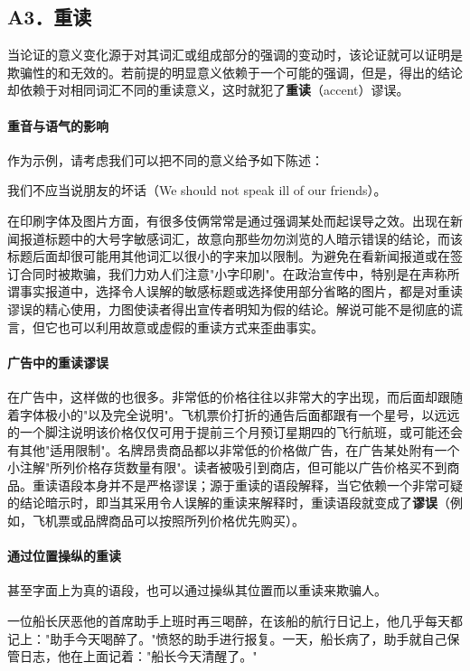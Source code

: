 \subsection{A3．重读}

当论证的意义变化源于对其词汇或组成部分的强调的变动时，该论证就可以证明是欺骗性的和无效的。若前提的明显意义依赖于一个可能的强调，但是，得出的结论却依赖于对相同词汇不同的重读意义，这时就犯了\textbf{重读}（accent）谬误。

\paragraph{重音与语气的影响}
作为示例，请考虑我们可以把不同的意义给予如下陈述：

我们不应当说朋友的坏话（We should not speak ill of our friends）。

在印刷字体及图片方面，有很多伎俩常常是通过强调某处而起误导之效。出现在新闻报道标题中的大号字敏感词汇，故意向那些勿勿浏览的人暗示错误的结论，而该标题后面却很可能用其他词汇以很小的字来加以限制。为避免在看新闻报道或在签订合同时被欺骗，我们力劝人们注意"小字印刷"。在政治宣传中，特别是在声称所谓事实报道中，选择令人误解的敏感标题或选择使用部分省略的图片，都是对重读谬误的精心使用，力图使读者得出宣传者明知为假的结论。解说可能不是彻底的谎言，但它也可以利用故意或虚假的重读方式来歪曲事实。

\paragraph{广告中的重读谬误}
在广告中，这样做的也很多。非常低的价格往往以非常大的字出现，而后面却跟随着字体极小的"以及完全说明"。飞机票价打折的通告后面都跟有一个星号，以远远的一个脚注说明该价格仅仅可用于提前三个月预订星期四的飞行航班，或可能还会有其他"适用限制"。名牌昂贵商品都以非常低的价格做广告，在广告某处附有一个小注解"所列价格存货数量有限"。读者被吸引到商店，但可能以广告价格买不到商品。重读语段本身并不是严格谬误；源于重读的语段解释，当它依赖一个非常可疑的结论暗示时，即当其采用令人误解的重读来解释时，重读语段就变成了\textbf{谬误}（例如，飞机票或品牌商品可以按照所列价格优先购买）。

\paragraph{通过位置操纵的重读}
甚至字面上为真的语段，也可以通过操纵其位置而以重读来欺骗人。

一位船长厌恶他的首席助手上班时再三喝醉，在该船的航行日记上，他几乎每天都记上："助手今天喝醉了。"愤怒的助手进行报复。一天，船长病了，助手就自己保管日志，他在上面记着："船长今天清醒了。" 